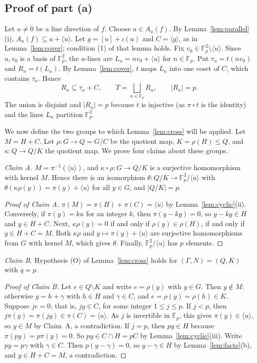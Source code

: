 \documentclass[11pt]{amsart}
\theoremstyle{definition}\newtheorem{definition}[theorem]{Definition}
\theoremstyle{remark}\newtheorem{remark}[theorem]{Remark}
\newcommand{\F}{\mathbb{F}}
\newcommand{\abs}[1]{\lvert #1\rvert}
\newcommand{\gen}[1]{\langle #1\rangle}
\begin{document}
\subsection{Proof of part (a)}
Let \(u\ne0\) be a line direction of \(f\).
Choose \(a\in A_u(f)\).
By Lemma~\ref{lem:parallel}(i), \(A_u(f)\subseteq a+\gen{u}\).
Let \(g=[u]+\iota(a)\) and \(C=\gen{g}\), as in Lemma~\ref{lem:cover}; condition (1) of that lemma holds.
Fix \(v_0\in\F_p^2\setminus\gen{u}\).
Since \(u,v_0\) is a basis of \(\F_p^2\), the \(u\)-lines are \(L_n=nv_0+\gen{u}\) for \(n\in\F_p\).
Put \(\tau_n=t(nv_0)\) and \(R_n=t(L_n)\).
By Lemma~\ref{lem:cover}, \(t\) maps \(L_n\) into one coset of \(C\), which contains \(\tau_n\).
Hence
\[
R_n\subseteq\tau_n+C,\qquad T=\bigsqcup_{n\in\F_p}R_n,\qquad \abs{R_n}=p .
\]
The union is disjoint and \(\abs{R_n}=p\) because \(t\) is injective (as \(\pi\circ t\) is the identity) and the lines \(L_n\) partition \(\F_p^2\).

We now define the two groups to which Lemma~\ref{lem:cross} will be applied.
Let \(M=H+C\).
Let \(\rho\colon G\to Q=G/C\) be the quotient map, \(K=\rho(H)\le Q\), and \(\kappa\colon Q\to Q/K\) the quotient map.
We prove four claims about these groups.

\emph{Claim A.} \(M=\pi^{-1}(\gen{u})\), and \(\kappa\circ\rho\colon G\to Q/K\) is a surjective homomorphism with kernel \(M\).
Hence there is an isomorphism \(\theta\colon Q/K\to\F_p^2/\gen{u}\) with \(\theta(\kappa\rho(y))=\pi(y)+\gen{u}\) for all \(y\in G\), and \(\abs{Q/K}=p\).

\begin{proof}[Proof of Claim A]
\(\pi(M)=\pi(H)+\pi(C)=\gen{u}\) by Lemma~\ref{lem:cyclic}(ii).
Conversely, if \(\pi(y)=ku\) for an integer \(k\), then \(\pi(y-kg)=0\), so \(y-kg\in H\) and \(y\in H+C\).
Next, \(\kappa\rho(y)=0\) if and only if \(\rho(y)\in\rho(H)\), if and only if \(y\in H+C=M\).
Both \(\kappa\rho\) and \(y\mapsto\pi(y)+\gen{u}\) are surjective homomorphisms from \(G\) with kernel \(M\), which gives \(\theta\).
Finally, \(\F_p^2/\gen{u}\) has \(p\) elements.
\end{proof}

\emph{Claim B.} Hypothesis (O) of Lemma~\ref{lem:cross} holds for \((\Gamma,N)=(Q,K)\) with \(q=p\).

\begin{proof}[Proof of Claim B]
Let \(e\in Q\setminus K\) and write \(e=\rho(y)\) with \(y\in G\).
Then \(y\notin M\): otherwise \(y=h+\gamma\) with \(h\in H\) and \(\gamma\in C\), and \(e=\rho(y)=\rho(h)\in K\).
Suppose \(je=0\), that is, \(jy\in C\), for some integer \(1\le j\le p\).
If \(j<p\), then \(j\pi(y)=\pi(jy)\in\pi(C)=\gen{u}\).
As \(j\) is invertible in \(\F_p\), this gives \(\pi(y)\in\gen{u}\), so \(y\in M\) by Claim~A, a contradiction.
If \(j=p\), then \(py\in H\) because \(\pi(py)=p\pi(y)=0\).
So \(py\in C\cap H=pC\) by Lemma~\ref{lem:cyclic}(iii).
Write \(py=p\gamma\) with \(\gamma\in C\).
Then \(p(y-\gamma)=0\), so \(y-\gamma\in H\) by Lemma~\ref{lem:facts}(b), and \(y\in H+C=M\), a contradiction.
\end{proof}
\end{document}
